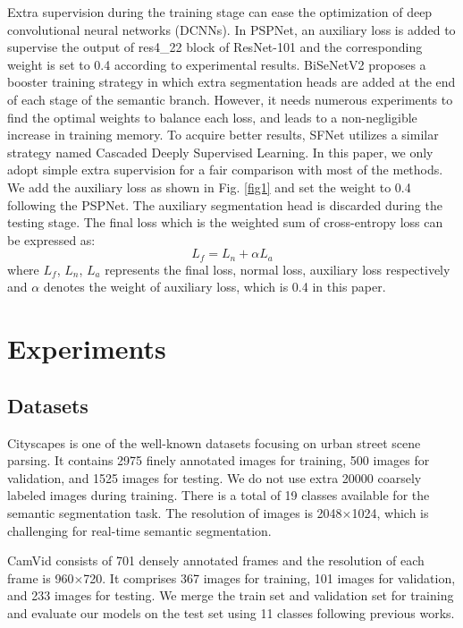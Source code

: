 \documentclass[journal]{IEEEtran}
\begin{document}
Extra supervision during the training stage can ease the optimization of deep convolutional neural networks (DCNNs). In PSPNet, an auxiliary loss is added to supervise the output of res4\_22 block of ResNet-101 and the corresponding weight is set to 0.4 according to experimental results\cite{zhao2017pyramid}. BiSeNetV2\cite{yu2020bisenet} proposes a booster training strategy in which extra segmentation heads are added at the end of each stage of the semantic branch. However, it needs numerous experiments to find the optimal weights to balance each loss, and leads to a non-negligible increase in training memory. To acquire better results, SFNet\cite{li2020semantic} utilizes a similar strategy named Cascaded Deeply Supervised Learning. In this paper, we only adopt simple extra supervision for a fair comparison with most of the methods. We add the auxiliary loss as shown in Fig. \ref{fig1} and set the weight to 0.4 following the PSPNet. The auxiliary segmentation head is discarded during the testing stage. The final loss which is the weighted sum of cross-entropy loss can be expressed as:
\begin{equation}
L_f = L_n + \alpha L_a
\label{eq3}
\end{equation}
where $L_f$, $L_n$, $L_a$ represents the final loss, normal loss, auxiliary loss respectively and $\alpha$ denotes the weight of auxiliary loss, which is 0.4 in this paper.

\section{Experiments}

\subsection{Datasets}

Cityscapes\cite{cordts2016cityscapes} is one of the well-known datasets focusing on urban street scene parsing. It contains 2975 finely annotated images for training, 500 images for validation, and 1525 images for testing. We do not use extra 20000 coarsely labeled images during training. There is a total of 19 classes available for the semantic segmentation task. The resolution of images is 2048$\times$1024, which is challenging for real-time semantic segmentation.

CamVid\cite{brostow2009semantic} consists of 701 densely annotated frames and the resolution of each frame is 960$\times$720. It comprises 367 images for training, 101 images for validation, and 233 images for testing. We merge the train set and validation set for training and evaluate our models on the test set using 11 classes following previous works\cite{yu2018bisenet,orsic2019defense,li2019dfanet}.
\end{document}
